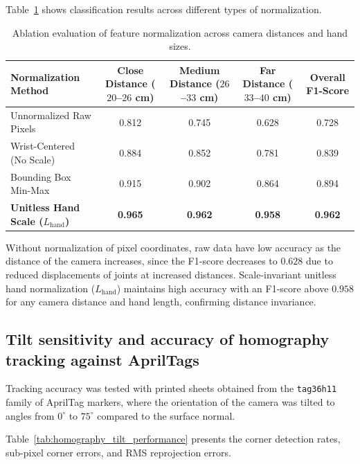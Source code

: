 Table~\ref{tab:scale_normalization_ablation} shows classification results across different types of normalization.

\begin{table}[htbp]
\centering
\caption{Ablation evaluation of feature normalization across camera distances and hand sizes.}
\label{tab:scale_normalization_ablation}
\begin{tabular}{l c c c c}
\toprule
\textbf{Normalization Method} & \textbf{Close Distance ($20$--$26$ cm)} & \textbf{Medium Distance ($26$--$33$ cm)} & \textbf{Far Distance ($33$--$40$ cm)} & \textbf{Overall F1-Score} \\
\midrule
Unnormalized Raw Pixels & 0.812 & 0.745 & 0.628 & 0.728 \\
Wrist-Centered (No Scale) & 0.884 & 0.852 & 0.781 & 0.839 \\
Bounding Box Min-Max & 0.915 & 0.902 & 0.864 & 0.894 \\
\textbf{Unitless Hand Scale ($L_{\text{hand}}$)} & \textbf{0.965} & \textbf{0.962} & \textbf{0.958} & \textbf{0.962} \\
\bottomrule
\end{tabular}%
\end{table}

Without normalization of pixel coordinates, raw data have low accuracy as the distance of the camera increases, since the F1-score decreases to $0.628$ due to reduced displacements of joints at increased distances. Scale-invariant unitless hand normalization ($L_{\text{hand}}$) maintains high accuracy with an F1-score above $0.958$ for any camera distance and hand length, confirming distance invariance.

\subsection{Tilt sensitivity and accuracy of homography tracking against AprilTags}
\label{subsec:test_homography_tilt}
Tracking accuracy was tested with printed sheets obtained from the \texttt{tag36h11} family of AprilTag markers, where the orientation of the camera was tilted to angles from $0^\circ$ to $75^\circ$ compared to the surface normal.

Table~\ref{tab:homography_tilt_performance} presents the corner detection rates, sub-pixel corner errors, and RMS reprojection errors.

